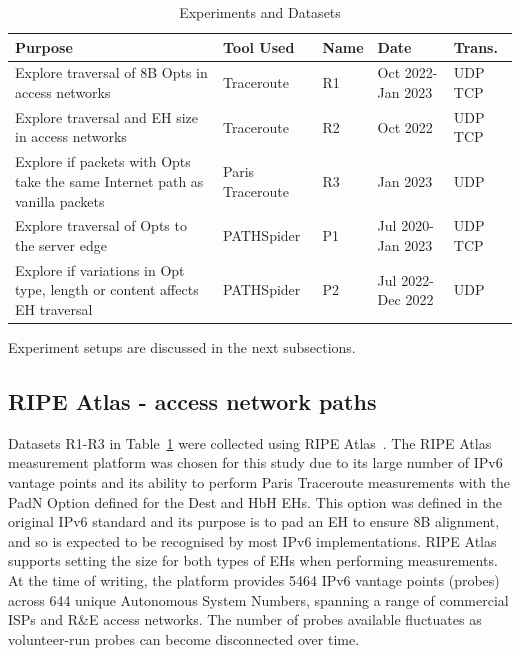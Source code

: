 \documentclass[conference]{IEEEtran}
\begin{document}
\begin{table}[h]
\begin{tabular}{p{}|p{}|p{}|p{}|p{}}
Purpose                                                                          & Tool Used        & Name & Date               & Trans. \\
\hline
Explore traversal of 8B Opts in access networks                                  & Traceroute       & R1           & Oct 2022- Jan 2023 & UDP TCP          \\
\hline
Explore traversal and EH size in access networks                                & Traceroute       & R2           & Oct 2022           & UDP TCP          \\
\hline
Explore if packets with Opts take the same Internet path as vanilla packets & Paris Traceroute & R3           & Jan 2023           & UDP               \\
\hline
Explore traversal of Opts to the server edge                              & PATHSpider       & P1           & Jul 2020- Jan 2023 & UDP TCP          \\
\hline
Explore if variations in Opt type, length or content affects EH traversal   & PATHSpider       & P2           & Jul 2022- Dec 2022     & UDP              
\end{tabular}
  \caption{Experiments and Datasets}
  \label{tbl:datasets}
\end{table}

Experiment setups are discussed in the next subsections.

    \subsection{RIPE Atlas - access network paths}
    \label{sec:ripe-methodology}

Datasets R1-R3 in Table~\ref{tbl:datasets} were collected using RIPE Atlas~\cite{bajpai2015lessons}.
The RIPE Atlas measurement platform was chosen for this study due to its large number of IPv6 vantage points and its ability to perform Paris Traceroute measurements with the PadN Option defined for the Dest and HbH EHs. This option was defined in the original IPv6 standard and its purpose is to pad an EH to ensure 8B alignment, and so is expected to be recognised by most IPv6 implementations.
RIPE Atlas supports setting the size for both types of EHs when performing measurements. At the time of writing, the platform provides 5464 IPv6 vantage points (probes) across 644 unique Autonomous System Numbers, spanning a range of commercial ISPs and R\&E access networks. The number of probes available fluctuates as volunteer-run probes can become disconnected over time.
\end{document}
